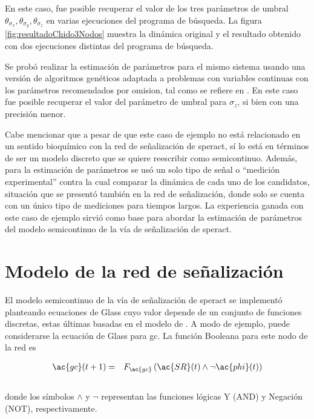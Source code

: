 En este caso, fue posible recuperar el valor de los tres parámetros de umbral $\theta_{\sigma_x}, \theta_{\sigma_y}, \theta_{\sigma_z}$ en varias ejecuciones del programa de búsqueda. La figura \ref{fig:resultadoChido3Nodos} muestra la dinámica original y el resultado obtenido con dos ejecuciones distintas del programa de búsqueda.

Se probó realizar la estimación de parámetros para el mismo sistema usando una versión de algoritmos genéticos adaptada a problemas con variables continuas con los parámetros recomendados por omision, tal como se refiere en \citeauthor{Haupt1998} \citep{Haupt1998}. En este caso fue posible recuperar el valor del parámetro de umbral para $\sigma_z$, si bien con una precisión menor.

Cabe mencionar que a pesar de que este caso de ejemplo no está relacionado en un sentido bioquímico con la red de señalización de speract, sí lo está en términos de ser un modelo discreto que se quiere reescribir como semicontinuo. Además, para la estimación de parámetros se usó un solo tipo de señal o ``medición experimental'' contra la cual comparar la dinámica de cada uno de los candidatos, situación que se presentó también en la red de señalización, donde solo se cuenta con un único tipo de mediciones para tiempos largos. La experiencia ganada con este caso de ejemplo sirvió como base para abordar la estimación de parámetros del modelo semicontinuo de la vía de señalización de speract.

\section{Modelo de la red de señalización}

El modelo semicontinuo de la vía de señalización de speract se implementó planteando ecuaciones de Glass cuyo valor depende de un conjunto de funciones discretas, estas últimas basadas en el modelo de \citeauthor{Espinal2011} \citep{Espinal2011}.%
A modo de ejemplo, puede considerarse la ecuación de Glass para \acf{gc}. La función Booleana para este nodo de la red es

\begin{eqnarray}
\ac{gc}(t+1) & = & F_{\ac{gc}} \left( \ac{SR}(t) \wedge \neg \ac{phi}(t) \right)
\end{eqnarray}
\\
donde los símbolos $\land$ y $\neg$ representan las funciones lógicas Y (AND) y Negación (NOT), respectivamente.
\\

